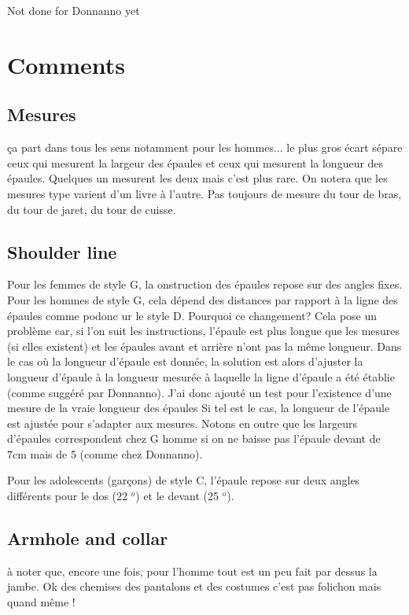 \documentclass[11pt,a4paper]{report}
\begin{document}
Not done for Donnanno yet

\section{Comments}

\subsection{Mesures}
ça part dans tous les sens notamment pour les hommes... le plus gros écart sépare ceux qui mesurent la largeur des épaules et ceux qui mesurent la longueur des épaules. Quelques un mesurent les deux mais c'est plus rare. On notera que les mesures type varient d'un livre à l'autre. Pas toujours de mesure du tour de bras, du tour de jaret, du tour de cuisse.

\subsection{Shoulder line}

Pour les femmes de style G, la  onstruction des épaules repose sur des angles fixes. Pour les hommes de style G, cela dépend des distances par rapport à la ligne des épaules comme podonc ur le style D. Pourquoi ce changement? Cela pose un problème car, si l'on suit les instructions, l'épaule est plus longue que les mesures (si elles existent) et les épaules avant et arrière n'ont pas la même longueur. Dans le cas où la longueur d'épaule est donnée, la solution est alors d'ajuster la longueur d'épaule à la longueur mesurée à laquelle la ligne d'épaule a été établie (comme suggéré par Donnanno). J'ai donc ajouté un test pour l'existence d'une mesure de la vraie longueur des épaules Si tel est le cas, la longueur de l'épaule est ajustée pour s'adapter aux mesures. Notons en outre que les largeurs d'épaules correspondent chez G homme si on ne baisse pas l'épaule devant de 7cm mais de 5 (comme chez Donnanno).


Pour les adolescents (garçons) de style C, l'épaule repose sur deux angles différents pour le dos (22 $ ^ o $) et le devant (25 $ ^ o $).



\subsection{Armhole and collar}

à noter que, encore une fois, pour l'homme tout est un peu fait par dessus
la jambe. Ok des chemises des pantalons et des costumes c'est pas
folichon mais quand même !
\end{document}
